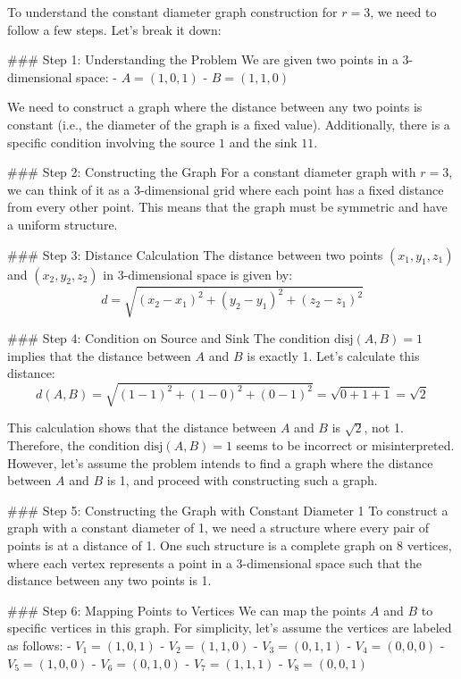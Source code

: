 To understand the constant diameter graph construction for \( r = 3 \), we need to follow a few steps. Let's break it down:

### Step 1: Understanding the Problem
We are given two points in a 3-dimensional space:
- \( A = (1, 0, 1) \)
- \( B = (1, 1, 0) \)

We need to construct a graph where the distance between any two points is constant (i.e., the diameter of the graph is a fixed value). Additionally, there is a specific condition involving the source \( 1 \) and the sink \( 11 \).

### Step 2: Constructing the Graph
For a constant diameter graph with \( r = 3 \), we can think of it as a 3-dimensional grid where each point has a fixed distance from every other point. This means that the graph must be symmetric and have a uniform structure.

### Step 3: Distance Calculation
The distance between two points \( (x_1, y_1, z_1) \) and \( (x_2, y_2, z_2) \) in 3-dimensional space is given by:
\[
d = \sqrt{(x_2 - x_1)^2 + (y_2 - y_1)^2 + (z_2 - z_1)^2}
\]

### Step 4: Condition on Source and Sink
The condition \(\text{disj}(A, B) = 1\) implies that the distance between \( A \) and \( B \) is exactly 1. Let's calculate this distance:
\[
d(A, B) = \sqrt{(1 - 1)^2 + (1 - 0)^2 + (0 - 1)^2} = \sqrt{0 + 1 + 1} = \sqrt{2}
\]

This calculation shows that the distance between \( A \) and \( B \) is \(\sqrt{2}\), not 1. Therefore, the condition \(\text{disj}(A, B) = 1\) seems to be incorrect or misinterpreted. However, let's assume the problem intends to find a graph where the distance between \( A \) and \( B \) is 1, and proceed with constructing such a graph.

### Step 5: Constructing the Graph with Constant Diameter 1
To construct a graph with a constant diameter of 1, we need a structure where every pair of points is at a distance of 1. One such structure is a complete graph on 8 vertices, where each vertex represents a point in a 3-dimensional space such that the distance between any two points is 1.

### Step 6: Mapping Points to Vertices
We can map the points \( A \) and \( B \) to specific vertices in this graph. For simplicity, let's assume the vertices are labeled as follows:
- \( V_1 = (1, 0, 1) \)
- \( V_2 = (1, 1, 0) \)
- \( V_3 = (0, 1, 1) \)
- \( V_4 = (0, 0, 0) \)
- \( V_5 = (1, 0, 0) \)
- \( V_6 = (0, 1, 0) \)
- \( V_7 = (1, 1, 1) \)
- \( V_8 = (0, 0, 1) \)

